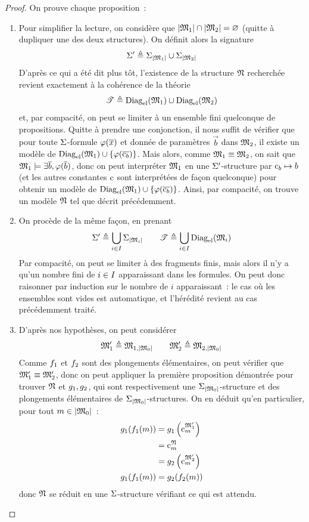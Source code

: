 \begin{proof}
  On prouve chaque proposition~:
  \begin{enumerate}[label=(\roman*)]
  \item Pour simplifier la lecture, on considère que
    $\left\vert \mathfrak{M}_1\right\vert\cap\left\vert \mathfrak{M}_2\right\vert=\varnothing$ (quitte à dupliquer une des deux
    structures). On définit alors la signature
    \[\Sigma' \triangleq \Sigma_{\left\vert \mathfrak{M}_1\right\vert}\cup\Sigma_{\left\vert \mathfrak{M}_2\right\vert}\]
    D'après ce qui a été dit plus tôt, l'existence de la structure $\mathfrak{N}$
    recherchée revient exactement à la cohérence de la théorie
    \[\mathscr T \triangleq \operatorname{Diag}_{\mathrm{el}}(\mathfrak{M}_1)\cup\operatorname{Diag}_{\mathrm{el}}(\mathfrak{M}_2)\]
    et, par compacité, on peut se limiter à un ensemble fini quelconque de
    propositions. Quitte à prendre une conjonction, il nous suffit de vérifier
    que pour toute $\Sigma$-formule $\varphi(\overline{x})$ et donnée de paramètres
    $\vec b$ dans $\mathfrak{M}_2$, il existe un modèle de
    $\operatorname{Diag}_{\mathrm{el}}(\mathfrak{M}_1)\cup\{\varphi(\overline{\mathrm{c}_b})\}$. Mais alors, comme
    $\mathfrak{M}_1\equiv\mathfrak{M}_2$, on sait que
    $\mathfrak{M}_1\models\exists \overline{b}, \varphi(\overline{b})$, donc on peut
    interpréter $\mathfrak{M}_1$ en une $\Sigma'$-structure par $\mathrm{c}_b \mapsto b$
    (et les autres constantes $\mathrm{c}$ sont interprétées de façon quelconque)
    pour obtenir un modèle de $\operatorname{Diag}_{\mathrm{el}}(\mathfrak{M}_1)\cup\{\varphi(\overline{\mathrm{c}_b})\}$.
    Ainsi, par compacité, on trouve un modèle $\mathfrak{N}$ tel que décrit
    précédemment.
  \item On procède de la même façon, en prenant
    \[\Sigma'\triangleq \bigcup_{i \in I}\Sigma_{\left\vert \mathfrak{M}_i\right\vert}\qquad
    \mathscr T\triangleq \bigcup_{i \in I}\operatorname{Diag}_{\mathrm{el}}(\mathfrak{M}_i)\]
    Par compacité, on peut se limiter à des fragments finis, mais alors il
    n'y a qu'un nombre fini de $i \in I$ apparaissant dans les
    formules. On peut donc raisonner par induction sur le nombre de
    $i$ apparaissant~: le cas où les ensembles sont vides est automatique,
    et l'hérédité revient au cas précédemment traité.
  \item D'après nos hypothèses, on peut considérer
    \[\mathfrak{M}_1' \triangleq \mathfrak{M}_{1,\left\vert \mathfrak{M}_0\right\vert} \qquad
    \mathfrak{M}_2' \triangleq \mathfrak{M}_{2,\left\vert \mathfrak{M}_0\right\vert}\]
    Comme $f_1$ et $f_2$ sont des plongements élémentaires, on peut
    vérifier que $\mathfrak{M}_1'\equiv\mathfrak{M}_2'$, donc on peut appliquer la première
    proposition démontrée pour trouver $\mathfrak{N}$ et $g_1,g_2$,
    qui sont respectivement une $\Sigma_{\left\vert \mathfrak{M}_0\right\vert}$-structure et des
    plongements élémentaires de $\Sigma_{\left\vert \mathfrak{M}_0\right\vert}$-structures. On
    en déduit qu'en particulier, pour tout $m \in \left\vert \mathfrak{M}_0\right\vert$~:
    \begin{align*}
      g_1(f_1(m))
      &= g_1\left(\mathrm{c}_{m}^{\mathfrak{M}_1'}\right)\\
      &= \mathrm{c}_{m}^{\mathfrak{N}}\\
      &= g_2\left(\mathrm{c}_{m}^{\mathfrak{M}_2'}\right)\\
      g_1(f_1(m)) &= g_2(f_2(m))
    \end{align*}
    donc $\mathfrak{N}$ se réduit en une $\Sigma$-structure vérifiant ce qui est
    attendu.\qedhere
  \end{enumerate}
\end{proof}

